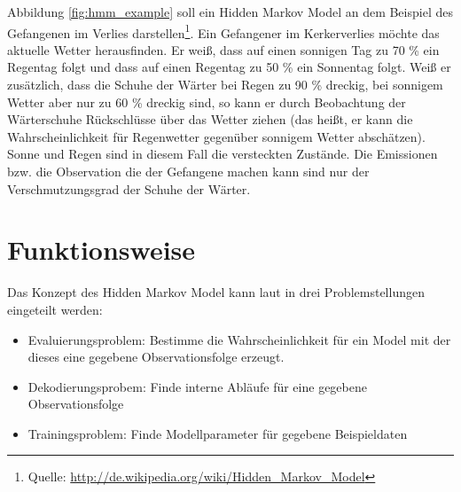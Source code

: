 Abbildung \ref{fig:hmm_example} soll ein Hidden Markov Model an dem Beispiel des Gefangenen im Verlies  darstellen\footnote{Quelle: \url{http://de.wikipedia.org/wiki/Hidden_Markov_Model}}. Ein Gefangener im Kerkerverlies möchte das aktuelle Wetter herausfinden. Er weiß, dass auf einen sonnigen Tag zu 70 \% ein Regentag folgt und dass auf einen Regentag zu 50 \% ein Sonnentag folgt. Weiß er zusätzlich, dass die Schuhe der Wärter bei Regen zu 90 \% dreckig, bei sonnigem Wetter aber nur zu 60 \% dreckig sind, so kann er durch Beobachtung der Wärterschuhe Rückschlüsse über das Wetter ziehen (das heißt, er kann die Wahrscheinlichkeit für Regenwetter gegenüber sonnigem Wetter abschätzen). Sonne und Regen sind in diesem Fall die versteckten Zustände. Die  Emissionen bzw. die Observation die der Gefangene machen kann sind nur der Verschmutzungsgrad der Schuhe der Wärter.


\section{Funktionsweise}
Das Konzept des Hidden Markov Model kann laut \cite{rabiner} in drei Problemstellungen eingeteilt werden:
\begin{itemize}
  \item Evaluierungsproblem: Bestimme die Wahrscheinlichkeit für ein Model mit
  der dieses eine gegebene Observationsfolge erzeugt.
  \item Dekodierungsprobem: Finde interne Abläufe für eine gegebene Observationsfolge
  \item Trainingsproblem: Finde Modellparameter für gegebene Beispieldaten
\end{itemize}

